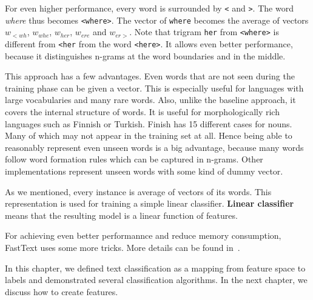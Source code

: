 For even higher performance, every word is surrounded by \texttt{<} and \texttt{>}.
The word \textit{ where} thus becomes \texttt{<where>}.
The vector of \texttt{where} becomes the average of vectors
$w_{<wh}$, 
$w_{whe}$, 
$w_{her}$,
$w_{ere}$ and
$w_{er>}$.
Note that trigram {\tt her} from \texttt{<where>} is different from {\tt <her} from the word {\tt <here>}.
It allows even better performance, because it distinguishes n-grams at the word boundaries and in the middle.

This approach has a few advantages.
Even words that are not seen during the training phase can be given a vector.
This is especially useful for languages with large vocabularies and many rare words.
Also, unlike the baseline approach, it covers the internal structure of words.
It is useful for morphologically rich languages such as Finnish or Turkish.
Finish has 15 different cases for nouns.
Many of which may not appear in the training set at all.
Hence being able to reasonably represent even unseen words is a big advantage,
because many words follow word formation rules which can be captured in n-grams.
Other implementations represent unseen words with some kind of dummy vector.

As we mentioned, every instance is average of vectors of its words.
This representation is used for training a simple linear classifier.
\textbf{Linear classifier} means that the resulting model is a linear function
of features.

For achieving even better performannce and reduce memory consumption, FastText uses some more tricks.
More details can be found in~\citet{Joulin2017bag}.








In this chapter, we defined text classification as a mapping from feature space to labels
and demonstrated several classification algorithms.
In the next chapter, we discuss how to create features.
